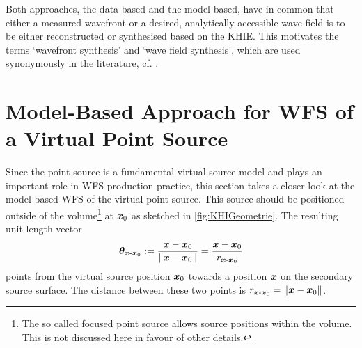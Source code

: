 Both approaches, the data-based and the model-based, have in common that
either a measured wavefront or a desired, analytically accessible wave field
is to be either reconstructed or synthesised based on the KHIE.
%
This motivates the terms `wavefront synthesis' and
`wave field synthesis', which are used synonymously
in the literature, cf. \cite{Berkhout1992b,Berkhout1992a}.



\section{Model-Based Approach for WFS of a Virtual Point Source}
\label{sec:WFS_PointSource}

Since the point source is a fundamental virtual source model and plays an
important role in WFS production practice, this section takes a closer look at
the model-based WFS of the virtual point source.
%
This source should be positioned outside of the volume\footnote{The so called
focused point source allows source positions within the volume. This is not
discussed here in favour of other details.} at $\bm{x}_\mathrm{0}$ as sketched in
\myfig\ref{fig:KHIGeometrie}.
%
The resulting unit length vector
\begin{align}
\bm{\theta}_{\bm{x}\text{-}\bm{x}_\mathrm{0}} :=
\frac{\bm{x}-\bm{x}_\mathrm{0}}{\|\bm{x}-\bm{x}_\mathrm{0}\|} =
\frac{\bm{x}-\bm{x}_\mathrm{0}}{r_{\bm{x}\text{-}\bm{x}_\mathrm{0}}}
\end{align}
points from the virtual source position $\bm{x}_\mathrm{0}$ towards a position $\bm{x}$ on the
secondary source surface.
%
The distance between these two points is $r_{\bm{x}\text{-}\bm{x}_\mathrm{0}}=\|\bm{x}-\bm{x}_\mathrm{0}\|$.



